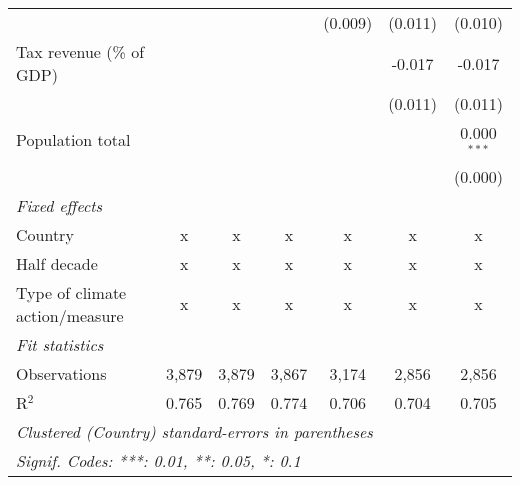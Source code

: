 \begin{tabular}{lcccccc}
                                                       &         &              &               & (0.009)        & (0.011)        & (0.010)\\   
   Tax revenue (\% of GDP)                             &         &              &               &                & -0.017         & -0.017\\   
                                                       &         &              &               &                & (0.011)        & (0.011)\\   
   Population total                                    &         &              &               &                &                & 0.000$^{***}$\\   
                                                       &         &              &               &                &                & (0.000)\\   
   \emph{Fixed effects}\\
   Country                                             & x       & x            & x             & x              & x              & x\\  
   Half decade                                         & x       & x            & x             & x              & x              & x\\  
   Type of climate action/measure                      & x       & x            & x             & x              & x              & x\\  
   \midrule \emph{Fit statistics}\\
   Observations                                        & 3,879   & 3,879        & 3,867         & 3,174          & 2,856          & 2,856\\  
   R$^2$                                               & 0.765   & 0.769        & 0.774         & 0.706          & 0.704          & 0.705\\  
   \midrule
   \multicolumn{7}{l}{\emph{Clustered (Country) standard-errors in parentheses}}\\
   \multicolumn{7}{l}{\emph{Signif. Codes: ***: 0.01, **: 0.05, *: 0.1}}\\
\end{tabular}
\par\endgroup



